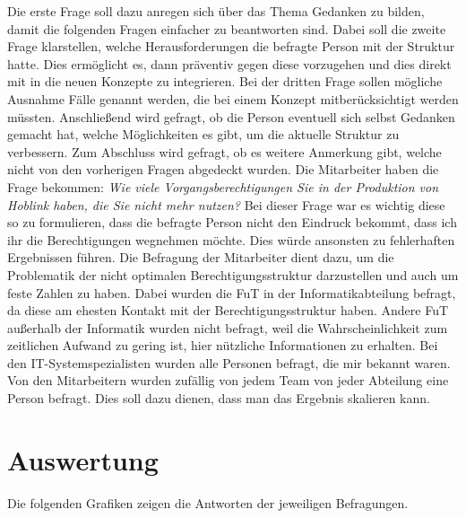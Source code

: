 Die erste Frage soll dazu anregen sich über das Thema Gedanken zu bilden, damit die folgenden Fragen einfacher zu beantworten sind.
Dabei soll die zweite Frage klarstellen, welche Herausforderungen die befragte Person mit der Struktur hatte.
Dies ermöglicht es, dann präventiv gegen diese vorzugehen und dies direkt mit in die neuen Konzepte zu integrieren.
Bei der dritten Frage sollen mögliche Ausnahme Fälle genannt werden, die bei einem Konzept mitberücksichtigt werden müssten.
Anschließend wird gefragt, ob die Person eventuell sich selbst Gedanken gemacht hat, welche Möglichkeiten es gibt, um die aktuelle Struktur zu verbessern.
Zum Abschluss wird gefragt, ob es weitere Anmerkung gibt, welche nicht von den vorherigen Fragen abgedeckt wurden.
\newline
\newline
Die Mitarbeiter haben die Frage bekommen:
\newline
\newline
\textit{Wie viele Vorgangsberechtigungen Sie in der Produktion von Hoblink haben, die Sie nicht mehr nutzen?}
\newline
\newline
Bei dieser Frage war es wichtig diese so zu formulieren, dass die befragte Person nicht den Eindruck bekommt, dass ich ihr die Berechtigungen wegnehmen möchte.
Dies würde ansonsten zu fehlerhaften Ergebnissen führen.
Die Befragung der Mitarbeiter dient dazu, um die Problematik der nicht optimalen Berechtigungsstruktur darzustellen und auch um feste Zahlen zu haben.
\newline
\newline
Dabei wurden die \ac{FuT} in der Informatikabteilung befragt, da diese am ehesten Kontakt mit der Berechtigungsstruktur haben.
Andere \ac{FuT} außerhalb der Informatik wurden nicht befragt, weil die Wahrscheinlichkeit zum zeitlichen Aufwand zu gering ist, hier nützliche Informationen zu erhalten.
Bei den IT-Systemspezialisten wurden alle Personen befragt, die mir bekannt waren.
Von den Mitarbeitern wurden zufällig von jedem Team von jeder Abteilung eine Person befragt.
Dies soll dazu dienen, dass man das Ergebnis skalieren kann.
\newpage
\section{Auswertung}
\label{sec:Auswertung}

Die folgenden Grafiken zeigen die Antworten der jeweiligen Befragungen.

